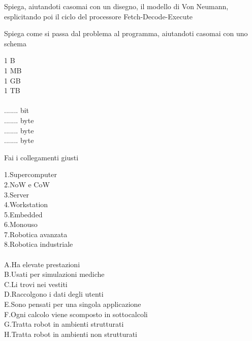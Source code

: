 \documentclass[addpoints]{exam}
\begin{document}
 
\begin{center}
\end{center}

\vspace{5mm}

 
\vspace{10mm}



\begin{questions}

\question[2] Spiega, aiutandoti casomai con un disegno, il modello di Von Neumann, esplicitando poi il ciclo del processore Fetch-Decode-Execute

\question[1] Spiega come si passa dal problema al programma, aiutandoti casomai con uno schema

\question[1]
\begin{multicols}{2}
1 B \\
1 MB \\
1 GB \\
1 TB \\\\
....... bit \\
....... byte \\
....... byte \\
....... byte \\
\end{multicols}

\question[2] Fai i collegamenti giusti
\begin{multicols}{2}
1.Supercomputer \\ 2.NoW e CoW \\ 3.Server \\ 4.Workstation \\ 5.Embedded \\ 6.Monouso \\ 7.Robotica avanzata \\ 8.Robotica industriale \\\\
A.Ha elevate prestazioni \\ B.Usati per simulazioni mediche \\ C.Li trovi nei vestiti \\  D.Raccolgono i dati degli utenti \\  E.Sono pensati per una singola applicazione \\ F.Ogni calcolo viene scomposto in sottocalcoli \\ G.Tratta robot in ambienti strutturati \\ H.Tratta robot in ambienti non strutturati
\end{multicols}


\end{questions}
\end{document}
